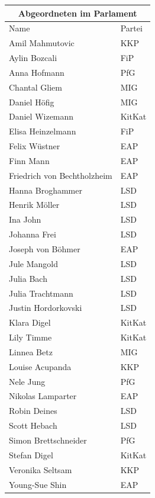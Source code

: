 \documentclass{sasbase}
\begin{document}
\begin{center}
    \begin{tabular}{ |p{5cm}|p{3cm}| }
     \hline
     \multicolumn{2}{|c|}{Abgeordneten im Parlament} \\
     \hline
     Name & Partei \\
     \hline
    Amil Mahmutovic & KKP \\
    Aylin Bozcali & FiP\\
    Anna Hofmann & PfG\\
    Chantal Gliem & MIG\\
    Daniel Höfig & MIG\\
    Daniel Wizemann & KitKat\\
    Elisa Heinzelmann & FiP\\
    Felix Wüstner & EAP\\
    Finn Mann & EAP\\
    Friedrich von Bechtholzheim & EAP\\
    Hanna Broghammer & LSD\\
    Henrik Möller & LSD\\
    Ina John & LSD\\
    Johanna Frei & LSD\\
    Joseph von Böhmer & EAP\\
    Jule Mangold & LSD\\
    Julia Bach & LSD\\
    Julia Trachtmann & LSD\\
    Justin Hordorkovski & LSD\\
    Klara Digel & KitKat\\
    Lily Timme & KitKat\\
    Linnea Betz & MIG\\
    Louise Acupanda & KKP\\
    Nele Jung & PfG\\
    Nikolas Lamparter & EAP\\
    Robin Deines & LSD\\
    Scott Hebach & LSD\\
    Simon Brettschneider & PfG\\
    Stefan Digel & KitKat\\
    Veronika Seltsam & KKP\\
    Young-Sue Shin & EAP\\
    \hline
    \end{tabular}
\end{center}
\end{document}
